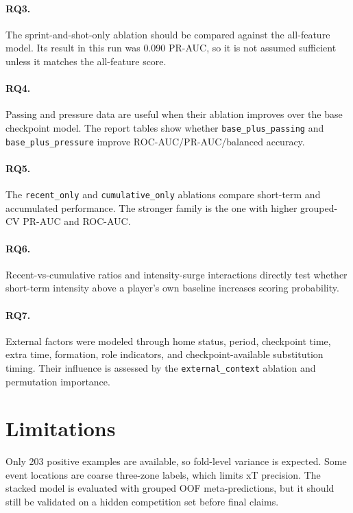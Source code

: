 \documentclass[11pt]{article}
\begin{document}
\paragraph{RQ3.}
The sprint-and-shot-only ablation should be compared against the all-feature model. Its result in this run was 0.090 PR-AUC, so it is not assumed sufficient unless it matches the all-feature score.
\paragraph{RQ4.}
Passing and pressure data are useful when their ablation improves over the base checkpoint model. The report tables show whether \texttt{base\_plus\_passing} and \texttt{base\_plus\_pressure} improve ROC-AUC/PR-AUC/balanced accuracy.
\paragraph{RQ5.}
The \texttt{recent\_only} and \texttt{cumulative\_only} ablations compare short-term and accumulated performance. The stronger family is the one with higher grouped-CV PR-AUC and ROC-AUC.
\paragraph{RQ6.}
Recent-vs-cumulative ratios and intensity-surge interactions directly test whether short-term intensity above a player's own baseline increases scoring probability.
\paragraph{RQ7.}
External factors were modeled through home status, period, checkpoint time, extra time, formation, role indicators, and checkpoint-available substitution timing. Their influence is assessed by the \texttt{external\_context} ablation and permutation importance.

\section{Limitations}
Only 203 positive examples are available, so fold-level variance is expected. Some event locations are coarse three-zone labels, which limits xT precision. The stacked model is evaluated with grouped OOF meta-predictions, but it should still be validated on a hidden competition set before final claims.
\end{document}
